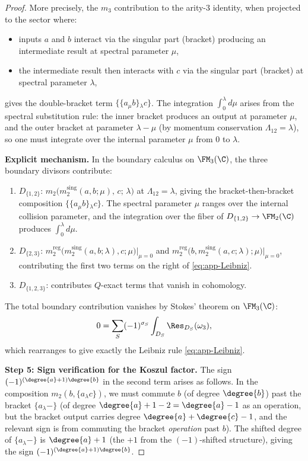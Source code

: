 \begin{proof}
More precisely, the $m_3$ contribution to the arity-3 identity, when projected to the sector where:
\begin{itemize}
\item inputs $a$ and $b$ interact via the singular part (bracket) producing an intermediate result at spectral parameter $\mu$,
\item the intermediate result then interacts with $c$ via the singular part (bracket) at spectral parameter $\lambda$,
\end{itemize}
gives the double-bracket term $\{\{a{}_\mu b\}{}_\lambda c\}$. The integration $\int_0^\lambda d\mu$ arises from the spectral substitution rule: the inner bracket produces an output at parameter $\mu$, and the outer bracket at parameter $\lambda - \mu$ (by momentum conservation $\Lambda_{12} = \lambda$), so one must integrate over the internal parameter $\mu$ from $0$ to $\lambda$.

\textbf{Explicit mechanism.} In the boundary calculus on $\FM_3(\C)$, the three boundary divisors contribute:
\begin{enumerate}
\item $D_{\{1,2\}}$: $m_2\bigl(m_2^{\mathrm{sing}}(a,b;\mu),\, c;\, \lambda\bigr)$ at $\Lambda_{12} = \lambda$, giving the bracket-then-bracket composition $\{\{a{}_\mu b\}{}_\lambda c\}$. The spectral parameter $\mu$ ranges over the internal collision parameter, and the integration over the fiber of $D_{\{1,2\}} \to \FM_2(\C)$ produces $\int_0^\lambda d\mu$.

\item $D_{\{2,3\}}$: $m_2^{\mathrm{reg}}\bigl(m_2^{\mathrm{sing}}(a,b;\lambda),c;\mu\bigr)\big|_{\mu=0}$ and $m_2^{\mathrm{reg}}\bigl(b,m_2^{\mathrm{sing}}(a,c;\lambda);\mu\bigr)\big|_{\mu=0}$, contributing the first two terms on the right of \eqref{eq:app-Leibniz}.

\item $D_{\{1,2,3\}}$: contributes $Q$-exact terms that vanish in cohomology.
\end{enumerate}

The total boundary contribution vanishes by Stokes' theorem on $\FM_3(\C)$:
\[
0 = \sum_S (-1)^{\sigma_S}\int_{D_S} \Res_{D_S}(\omega_3),
\]
which rearranges to give exactly the Leibniz rule \eqref{eq:app-Leibniz}.

\textbf{Step 5: Sign verification for the Koszul factor.}
The sign $(-1)^{(\degree{a}+1)\degree{b}}$ in the second term arises as follows. In the composition $m_2(b, \{a{}_\lambda c\})$, we must commute $b$ (of degree $\degree{b}$) past the bracket $\{a{}_\lambda -\}$ (of degree $\degree{a}+1-2 = \degree{a}-1$ as an operation, but the bracket output carries degree $\degree{a}+\degree{c}-1$, and the relevant sign is from commuting the bracket \emph{operation} past $b$). The shifted degree of $\{a{}_\lambda -\}$ is $\degree{a}+1$ (the $+1$ from the $(-1)$-shifted structure), giving the sign $(-1)^{(\degree{a}+1)\degree{b}}$.
\end{proof}

